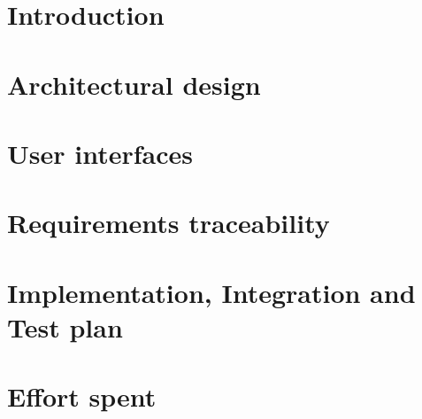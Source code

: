 \documentclass{TitlePage/Configuration_Files/PoliMi3i_thesis}
\begin{document}
\pagestyle{empty}


\tableofcontents{}
\clearpage
\pagestyle{fancy}
\setcounter{page}{1} %


\section{Introduction}


\section{Architectural design}


\section{User interfaces}


\section{Requirements traceability}


\section{Implementation, Integration and Test plan}


\section{Effort spent}



\end{document}

